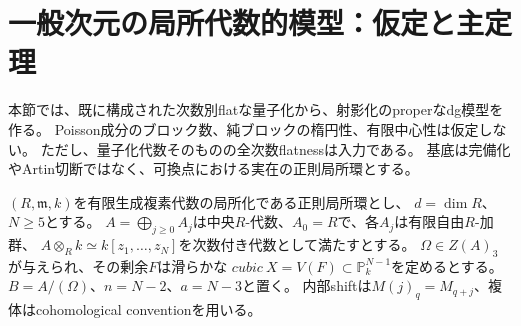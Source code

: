 \section{一般次元の局所代数的模型：仮定と主定理}
\label{lp:sec:main}
本節では、既に構成された次数別flatな量子化から、射影化のproperなdg模型を作る。
Poisson成分のブロック数、純ブロックの楕円性、有限中心性は仮定しない。
ただし、量子化代数そのものの全次数flatnessは入力である。
基底は完備化やArtin切断ではなく、可換点における実在の正則局所環とする。

\begin{definition}[局所入力]\label{lp:def:input}
$(R,\mathfrak m,k)$を有限生成複素代数の局所化である正則局所環とし、
$d=\dim R$、$N\ge5$とする。
$A=\bigoplus_{j\ge0}A_j$は中央$R$-代数、$A_0=R$で、各$A_j$は有限自由$R$-加群、
$A\otimes_R k\simeq k[z_1,\ldots,z_N]$を次数付き代数として満たすとする。
$\Omega\in Z(A)_3$が与えられ、その剰余$F$は滑らかな
$cubic\ X=V(F)\subset\mathbb P^{N-1}_k$を定めるとする。
$B=A/(\Omega)$、$n=N-2$、$a=N-3$と置く。
内部shiftは$M(j)_q=M_{q+j}$、複体はcohomological conventionを用いる。
\end{definition}

